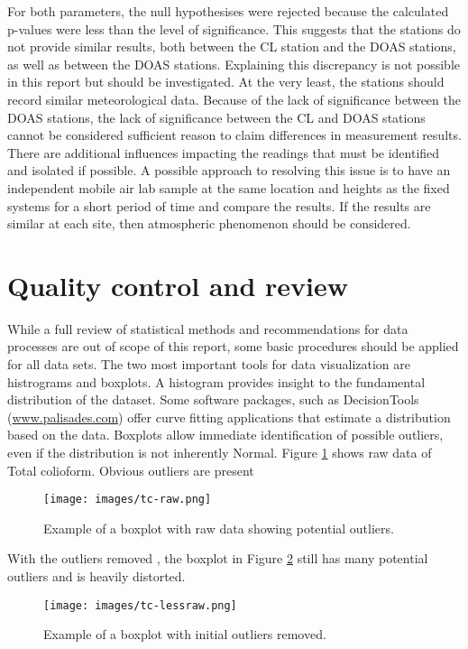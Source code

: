 For both parameters, the null hypothesises were rejected because the calculated p-values were less than the level of significance. This suggests that the stations do not provide similar results, both between the CL station and the DOAS stations, as well as between the DOAS stations. Explaining this discrepancy is not possible in this report but should be investigated. At the very least, the stations should record similar meteorological data. Because of the lack of significance between the DOAS stations, the lack of significance between the CL and DOAS stations cannot be considered sufficient reason to claim differences in measurement results. There are additional influences impacting the readings that must be identified and isolated if possible. A possible approach to resolving this issue is to have an independent mobile air lab sample at the same location and heights as the fixed systems for a short period of time and compare the results. If the results are similar at each site, then atmospheric phenomenon should be considered.

\section{Quality control and review}

While a full review of statistical methods and recommendations for data processes are out of scope of this report, some basic procedures should be applied for all data sets. The two most important tools for data visualization are histrograms and boxplots.  A histogram provides insight to the fundamental distribution of the dataset. Some software packages, such as DecisionTools (\url{www.palisades.com}) offer curve fitting applications that estimate a distribution based on the data. Boxplots allow immediate identification of possible outliers, even if the distribution is not inherently Normal. Figure \ref{fig:rawtc} shows raw data of Total colioform. Obvious outliers are present

\begin{figure}[H]
\centering
\texttt{[image: images/tc-raw.png]} 
\caption{Example of a boxplot with raw data showing potential outliers.}
\label{fig:rawtc}
\end{figure}

With the outliers removed , the boxplot in Figure \ref{fig:lessrawtc} still has many potential outliers and is heavily distorted.

\begin{figure}[H]
\centering
\texttt{[image: images/tc-lessraw.png]} 
\caption{Example of a boxplot with initial outliers removed.}
\label{fig:lessrawtc}
\end{figure}

